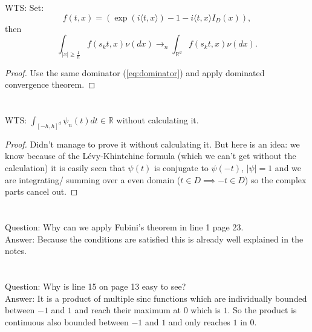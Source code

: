 \documentclass[a4paper,11pt]{article}
\begin{document}
\section{}
WTS:
Set:
\begin{equation}
    f(t,x) =  ( \exp ( i \langle t, x \rangle)-1-i \langle t, x \rangle I_{D} ( x ) ),
\end{equation}
then
\begin{equation}
    \int_{|x| \ge \frac{1}{n} } f(s_{k}t,x) \nu( d x )\rightarrow_{n} \int_{\mathbb{R}^{d}} f(s_{k}t,x) \nu( d x )
    .
\end{equation}
\begin{proof}
    Use the same dominator (\ref{eq:dominator}) and apply dominated convergence theorem.
\end{proof}

\section{}
WTS: $\int_{[-h,h]^{d}} \psi_{n}(t) dt  \in  \mathbb{R}$ without calculating it.
\begin{proof}
    Didn't manage to prove it without calculating it. But here is an idea: we know
    because of the Lévy-Khintchine formula (which we can't get without the calculation) it is
    easily seen that $\psi(t)$ is conjugate to $\psi(-t)$,  $|\psi|=1 $ and we are integrating/ summing over
    a even domain ($t \in D \implies -t \in D$) so the complex parts cancel out.
\end{proof}

\section{}
Question: Why can we apply Fubini's theorem in line 1 page 23. \\
Answer: Because the conditions are satisfied this is already well explained in the notes.

\section{}
Question: Why is line 15 on page 13 easy to see? \\
Answer: It is a product of multiple sinc functions which are individually bounded between $-1$ and $1$ 
and reach their maximum at $0$ which is $1$. So the product is continuous also bounded between $-1$ and $1$
and only reaches $1$ in $0$. 

\section{}
\end{document}
